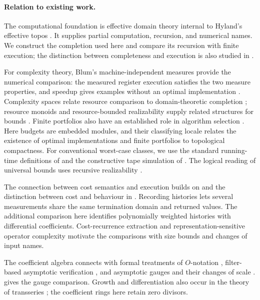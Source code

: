 \documentclass[11pt,a4paper]{article}
\numberwithin{algorithm}{section}
\numberwithin{equation}{section}
\theoremstyle{definition}
\theoremstyle{remark}
\theoremstyle{plain}
\theoremstyle{definition}
\theoremstyle{plain}
\begin{document}
\paragraph{Relation to existing work.}
The computational foundation is effective domain theory internal to
Hyland's effective topos
\citep{Smyth1977EffectiveDomains,AbramskyJung1994DomainTheory,Hyland1982EffectiveTopos,VanOosten2008Realizability}.
It supplies partial computation, recursion, and numerical names.
We construct the completion used here and compare its recursion with
finite execution; the distinction between completeness and execution
is also studied in
\citep{VanOostenSimpson2000SyntheticDomains}.

For complexity theory, Blum's machine-independent measures provide
the numerical comparison: the measured register execution satisfies
the two measure properties, and speedup gives examples without an
optimal implementation \citep{Blum1967MachineIndependentComplexity}.
Complexity spaces relate resource comparison to domain-theoretic
completion \citep{Schellekens1995SmythCompletion}; resource monoids and
resource-bounded realizability supply related structures for bounds
\citep{DalLagoHofmann2011RealizabilityComplexity}. Finite portfolios
also have an established role in algorithm selection
\citep{GomesSelman2001AlgorithmPortfolios}. Here budgets are embedded
modules, and their classifying locale relates the existence of optimal
implementations and finite portfolios to topological compactness.
For conventional worst-case classes, we use the standard running-time
definitions of \citet[Chapter 13]{BarakRunningTime} and the constructive
tape simulation of \citet{HennieStearns1966}. The logical reading of
universal bounds uses recursive realizability
\citep{Kleene1945,Hyland1982EffectiveTopos}.

The connection between cost semantics and execution builds on
\citet{NiuSterlingHarper2024CostSensitiveSDT} and the distinction
between cost and behaviour in
\citep{NiuSterlingGrodinHarper2022Calf,GrodinNiuSterlingHarper2024Decalf}.
Recording histories lets several measurements share the same
termination domain and returned values. The additional comparison
here identifies polynomially weighted histories with differential
coefficients. Cost-recurrence extraction
\citep{DannerLicataRamyaa2015CostSemantics} and representation-sensitive
operator complexity \citep{KawamuraCook2012Operators} motivate the
comparisons with size bounds and changes of input names.

The coefficient algebra connects with formal treatments of
$O$-notation \citep{AvigadDonnelly2004ONotation}, filter-based
asymptotic verification \citep{GueneauChargueraudPottier2018Fistful},
and asymptotic gauges and their changes of scale
\citep{GiordanoLuperiBaglini2016AsymptoticGauges,LuperiBagliniGiordano2017CategoryColombeau}.
 gives the gauge comparison.
Growth and differentiation also occur in the theory of transseries
\citep{AschenbrennerVanDenDriesVanDerHoeven2017Transseries}; the
coefficient rings here retain zero divisors.
\end{document}
